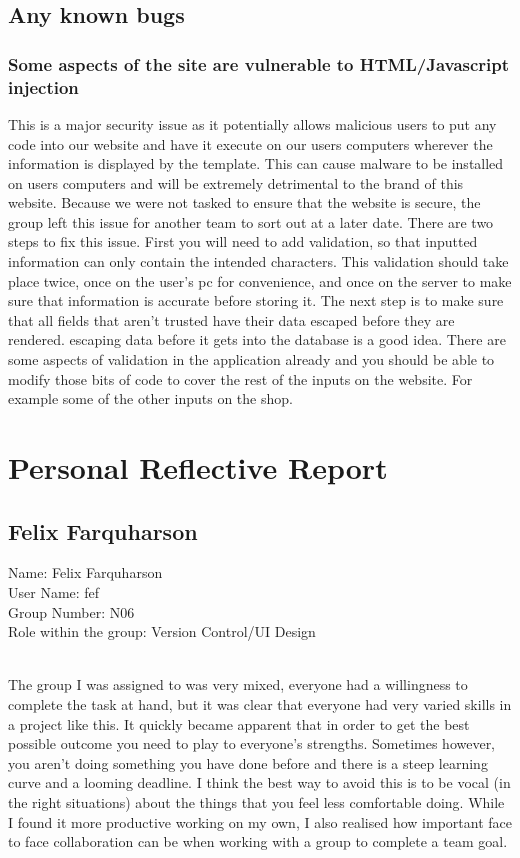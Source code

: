 \documentclass[titlepage]{article}
\begin{document}
{\subsection{Any known bugs}
\subsubsection{Some aspects of the site are vulnerable to HTML/Javascript injection}
This is a major security issue as it potentially allows malicious users to put any code into our website and have it execute on our users computers wherever the information is displayed by the template. This can cause malware to be installed on users computers and will be extremely detrimental to the brand of this website.
Because we were not tasked to ensure that the website is secure, the group left this issue for another team to sort out at a later date.
There are two steps to fix this issue. First you will need to add validation, so that inputted information can only contain the intended characters. This validation should take place twice, once on the user’s pc for convenience, and once on the server to make sure that information is accurate before storing it. The next step is to make sure that all fields that aren’t trusted have their data escaped before they are rendered. escaping data before it gets into the database is a good idea.
There are some aspects of validation in the application already and you should be able to modify those bits of code to cover the rest of the inputs on the website. For example some of the other inputs on the shop.
\section {Personal Reflective Report}
\subsection {Felix Farquharson}
\normalsize{Name: Felix Farquharson}
\\
\normalsize{User Name: fef}
\\
\normalsize{Group Number: N06}
\\
\normalsize{Role within the group: Version Control/UI Design}
\\
\\
\normalsize {The group I was assigned to was very mixed, everyone had a willingness to complete the task at hand, but it was clear that everyone had very varied skills in a project like this. It quickly became apparent that in order to get the best possible outcome you need to play to everyone's strengths. Sometimes however, you aren't doing something you have done before and there is a steep learning curve and a looming deadline. I think the best way to avoid this is to be vocal (in the right situations) about the things that you feel less comfortable doing. While I found it more productive working on my own, I also realised how important face to face collaboration can be when working with a group to complete a team goal.

}}
\end{document}
